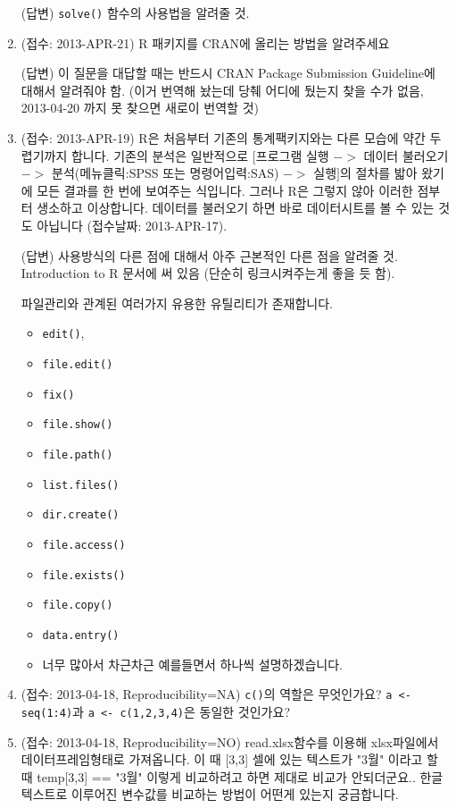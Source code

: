 \documentclass{article}
\begin{document}
\begin{enumerate}
	\textsf{(답변)} \texttt{solve()} 함수의 사용법을 알려줄 것.
	
	\item (접수: 2013-APR-21) R 패키지를 CRAN에 올리는 방법을 알려주세요 
	
	\textsf{(답변)} 이 질문을 대답할 때는 반드시 CRAN Package Submission Guideline에 대해서 알려줘야 함.  (이거 번역해 놨는데 당췌 어디에 뒀는지 찾을 수가 없음, 2013-04-20 까지 못 찾으면 새로이 번역할 것)
	
	\item (접수: 2013-APR-19) R은 처음부터 기존의 통계팩키지와는 다른 모습에 약간 두렵기까지 합니다.  기존의 분석은 일반적으로 $[$프로그램 실행 $->$ 데이터 불러오기 $->$ 분석(메뉴클릭:SPSS 또는 명령어입력:SAS) $->$ 실행$]$의 절차를 밟아 왔기에 모든 결과를 한 번에 보여주는 식입니다. 그러나 R은 그렇지 않아 이러한 점부터 생소하고 이상합니다.  데이터를 불러오기 하면 바로 데이터시트를 볼 수 있는 것도 아닙니다 (접수날짜: 2013-APR-17).

	\textsf{(답변)} 사용방식의 다른 점에 대해서 아주 근본적인 다른 점을 알려줄 것.  Introduction to R 문서에 써 있음 (단순히 링크시켜주는게 좋을 듯 함). 
	
	파일관리와 관계된 여러가지 유용한 유틸리티가 존재합니다. 
	\begin{itemize}
		\item \texttt{edit()},
		\item \texttt{file.edit()}
		\item \texttt{fix()}
		\item \texttt{file.show()}
		\item \texttt{file.path()}
		\item \texttt{list.files()}
		\item \texttt{dir.create()}
		\item \texttt{file.access()}
		\item \texttt{file.exists()}
		\item \texttt{file.copy()}
		\item \texttt{data.entry()}
		\item 너무 많아서 차근차근 예를들면서 하나씩 설명하겠습니다. 
	\end{itemize}
	

	\item (접수: 2013-04-18, Reproducibility=NA) \texttt{c()}의 역할은 무엇인가요? \texttt{a <- seq(1:4)}과 \texttt{a <- c(1,2,3,4)}은 동일한 것인가요?
	
	\item (접수: 2013-04-18, Reproducibility=NO) read.xlsx함수를 이용해 xlsx파일에서 데이터프레임형태로 가져옵니다. 이 때 [3,3] 셀에 있는 텍스트가 "3월" 이라고 할 때 temp[3,3] == "3월" 이렇게 비교하려고 하면 제대로 비교가 안되더군요.. 한글 텍스트로 이루어진 변수값를 비교하는 방법이 어떤게 있는지 궁금합니다.
	

\end{enumerate}
\end{document}
